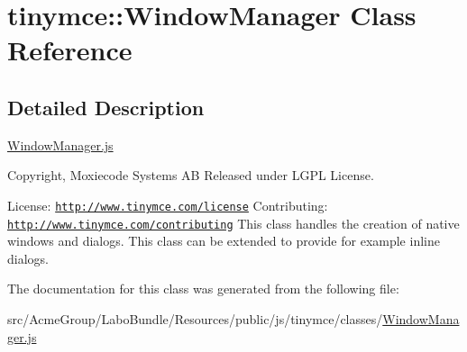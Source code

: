 \hypertarget{classtinymce_1_1_window_manager}{\section{tinymce\+:\+:Window\+Manager Class Reference}
\label{classtinymce_1_1_window_manager}
}


\subsection{Detailed Description}
\hyperlink{_window_manager_8js}{Window\+Manager.\+js}

Copyright, Moxiecode Systems A\+B Released under L\+G\+P\+L License.

License\+: \href{http://www.tinymce.com/license}{\tt http\+://www.\+tinymce.\+com/license} Contributing\+: \href{http://www.tinymce.com/contributing}{\tt http\+://www.\+tinymce.\+com/contributing} This class handles the creation of native windows and dialogs. This class can be extended to provide for example inline dialogs. 

The documentation for this class was generated from the following file\+:\begin{DoxyCompactItemize}
\item 
src/\+Acme\+Group/\+Labo\+Bundle/\+Resources/public/js/tinymce/classes/\hyperlink{_window_manager_8js}{Window\+Manager.\+js}\end{DoxyCompactItemize}
